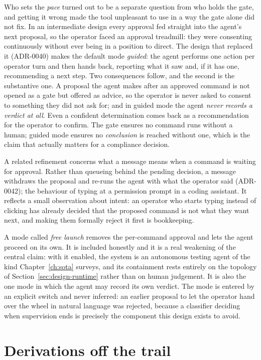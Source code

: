 Who sets the \emph{pace} turned out to be a separate question from who holds the
gate, and getting it wrong made the tool unpleasant to use in a way the gate alone
did not fix. In an intermediate design every approval fed straight into the agent's
next proposal, so the operator faced an approval treadmill: they were consenting
continuously without ever being in a position to direct. The design that replaced
it (ADR-0040) makes the default mode \emph{guided}: the agent performs one
action per operator turn and then hands back, reporting what it saw and, if it has
one, recommending a next step. Two consequences follow, and the second is the
substantive one. A proposal the agent makes after an approved command is not opened
as a gate but offered as advice, so the operator is never asked to consent to
something they did not ask for; and in guided mode the agent \emph{never records a
verdict at all}. Even a confident determination comes back as a recommendation for
the operator to confirm. The gate ensures no command runs without a human; guided
mode ensures no \emph{conclusion} is reached without one, which is the claim that
actually matters for a compliance decision.

A related refinement concerns what a message means when a command is waiting for
approval. Rather than queueing behind the pending decision, a message withdraws the
proposal and re-runs the agent with what the operator said (ADR-0042); the
behaviour of typing at a permission prompt in a coding assistant. It reflects a
small observation about intent: an operator who starts typing instead of clicking
has already decided that the proposed command is not what they want next, and
making them formally reject it first is bookkeeping.

A mode called \emph{free launch} removes the per-command approval and lets the
agent proceed on its own. It is included honestly and it is a real weakening of
the central claim: with it enabled, the system is an autonomous testing agent of
the kind Chapter~\ref{ch:sota} surveys, and its containment rests entirely on the
topology of Section~\ref{sec:design-runtime} rather than on human judgement. It is
also the one mode in which the agent may record its own verdict. The mode is
entered by an explicit switch and never inferred: an earlier proposal to let the
operator hand over the wheel in natural language was rejected, because a classifier
deciding when supervision ends is precisely the component this design exists to
avoid.

\section{Derivations off the trail}
\label{sec:design-derivations}

